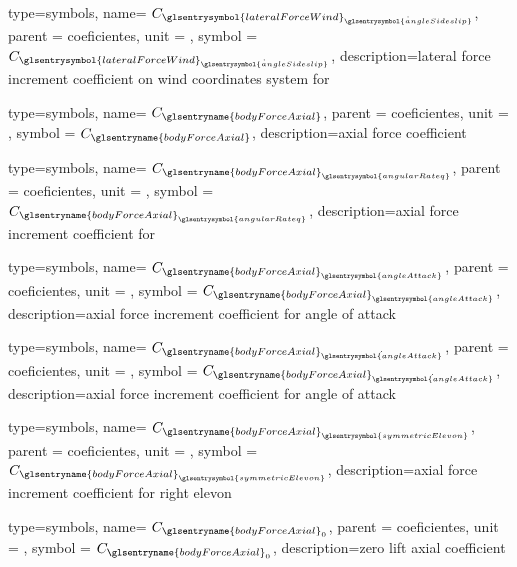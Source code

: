 {type=symbols,
    name= \ensuremath{C_{{\glsentrysymbol{lateralForceWind}}_{\dot{\glsentrysymbol{angleSideslip}}}}},
    parent = {coeficientes},
    unit = \unexpanded{},
    symbol = \ensuremath{C_{{\glsentrysymbol{lateralForceWind}}_{\dot{\glsentrysymbol{angleSideslip}}}}},
    description={lateral force increment coefficient on wind coordinates system  for }
}


{type=symbols,
    name= \ensuremath{C_{\glsentryname{bodyForceAxial}}},
    parent = {coeficientes},
    unit = \unexpanded{},
    symbol = \ensuremath{C_{\glsentryname{bodyForceAxial}}},
    description={axial force coefficient}
}

{type=symbols,
    name= \ensuremath{C_{{\glsentryname{bodyForceAxial}}_{\glsentrysymbol{angularRateq}}}},
    parent = {coeficientes},
    unit = \unexpanded{},
    symbol = \ensuremath{C_{{\glsentryname{bodyForceAxial}}_{\glsentrysymbol{angularRateq}}}},
    description={axial force increment coefficient for }
}

{type=symbols,
    name= \ensuremath{C_{{\glsentryname{bodyForceAxial}}_{\glsentrysymbol{angleAttack}}}},
    parent = {coeficientes},
    unit = \unexpanded{},
    symbol = \ensuremath{C_{{\glsentryname{bodyForceAxial}}_{\glsentrysymbol{angleAttack}}}},
    description={axial force increment coefficient for angle of attack}
}


{type=symbols,
    name= \ensuremath{C_{{\glsentryname{bodyForceAxial}}_{\dot{\glsentrysymbol{angleAttack}}}}},
    parent = {coeficientes},
    unit = \unexpanded{},
    symbol = \ensuremath{C_{{\glsentryname{bodyForceAxial}}_{\dot{\glsentrysymbol{angleAttack}}}}},
    description={axial force increment coefficient for angle of attack}
}

{type=symbols,
    name= \ensuremath{C_{{\glsentryname{bodyForceAxial}}_{\glsentrysymbol{symmetricElevon}}}},
    parent = {coeficientes},
    unit = \unexpanded{},
    symbol = \ensuremath{C_{{\glsentryname{bodyForceAxial}}_{\glsentrysymbol{symmetricElevon}}}},
    description={axial force increment coefficient for right elevon}
}

{type=symbols,
    name= \ensuremath{C_{{\glsentryname{bodyForceAxial}}_{0}}},
    parent = {coeficientes},
    unit = \unexpanded{},
    symbol = \ensuremath{C_{{\glsentryname{bodyForceAxial}}_{0}}},
    description={zero lift axial coefficient}
}